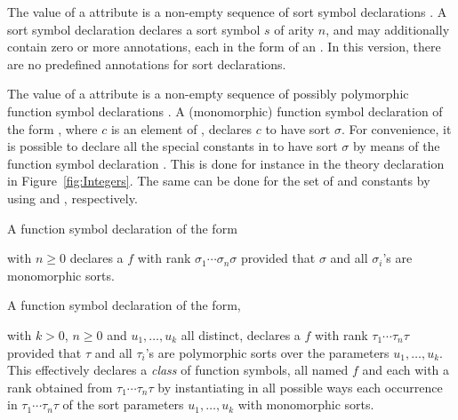 The value of a  attribute is a non-empty sequence
of sort symbol declarations .
A sort symbol declaration  declares 
a sort symbol $s$ of arity $n$, and 
may additionally contain zero or more annotations,
each in the form of an .
In this version, there are no predefined annotations for sort declarations.

The value of a  attribute is a non-empty sequence
of possibly polymorphic function symbol declarations .
A (monomorphic) function symbol declaration 
of the form ,
where $c$ is an element of ,
declares $c$ to have sort $\sigma$.
For convenience,
it is possible to declare all the special constants in  
to have sort $\sigma$ by means of the function symbol declaration
.
This is done for instance in the theory declaration in Figure~\ref{fig:Integers}.
The same can be done for the set of  and  constants
by using  and , respectively. 
 
A function symbol declaration of the form
\begin{center}
\end{center}
with $n \geq 0$ declares a  $f$ with rank 
$\sigma_1\cdots\sigma_n\sigma$
provided that $\sigma$ and all $\sigma_i$'s are monomorphic sorts.

A function symbol declaration of the form,
\begin{center}
\end{center}
with $k > 0$, $n \geq 0$ and $u_1, \ldots, u_k$ all distinct,
declares a  $f$ with rank $\tau_1\cdots\tau_n\tau$
provided that $\tau$ and all $\tau_i$'s are polymorphic sorts over 
the parameters $u_1, \ldots, u_k$.  
This effectively declares a \emph{class} of function symbols, 
all named $f$ and each with a rank obtained from $\tau_1\cdots\tau_n\tau$ 
by instantiating in all possible ways each occurrence in $\tau_1\cdots\tau_n\tau$
of the sort parameters $u_1,\ldots,u_k$ with monomorphic sorts.

